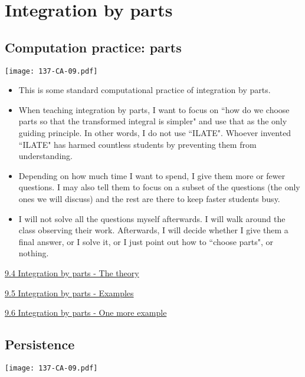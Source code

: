 \documentclass[11pt]{article}
\newcommand{\nl}{\hfill \vspace{-1.1\baselineskip}} %
\newcommand{\viv}{\hspace{8mm} \href{https://www.youtube.com/watch?v=taKIe3Ui3oI&list=PLlwePzQY_wW_DPAQSBjQmMs0hF8T7yVkF&index=4}{9.4 Integration by parts - The theory}}
\newcommand{\vv}{\hspace{8mm} \href{https://www.youtube.com/watch?v=15DJgDvMpTE&list=PLlwePzQY_wW_DPAQSBjQmMs0hF8T7yVkF&index=5}{9.5 Integration by parts - Examples}}
\newcommand{\vvi}{\hspace{8mm} \href{https://www.youtube.com/watch?v=gR-chzRVpWo&list=PLlwePzQY_wW_DPAQSBjQmMs0hF8T7yVkF&index=6}{9.6 Integration by parts - One more example}}
\begin{document}
\newpage
\section{Integration by parts}
\subsection{Computation practice: parts}

\begin{center}
{ \texttt{[image: 137-CA-09.pdf]}} 
\end{center}

\begin{comments}
\nl
	\begin{itemize}
		\item This is some standard computational practice of integration by parts.
		\item When teaching integration by parts, I want to focus on ``how do we choose parts so that the transformed integral is simpler" and use that as the only guiding principle.  In other words, I do not use ``ILATE".  Whoever invented ``ILATE" has harmed countless students by preventing them from understanding.
		\item  Depending on how much time I want to spend, I give them more or fewer questions.  I may also tell them to focus on a subset of the questions (the only ones we will discuss) and the rest are there to keep faster students busy.
		\item  I will not solve all the questions myself afterwards.  I will walk around the class observing their work.  Afterwards, I will decide whether I give them a final answer, or I solve it, or I just point out how to ``choose parts", or nothing.  
	\end{itemize}
\end{comments}

\begin{videos}
\viv

\vv

\vvi
\end{videos}

\newpage
\subsection{Persistence}

\begin{center}
{ \texttt{[image: 137-CA-09.pdf]}} 
\end{center}
\end{document}
